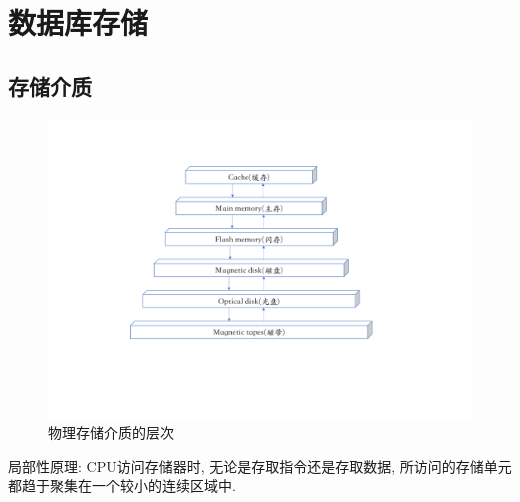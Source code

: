 \chapter{数据库存储}

\section{存储介质}

\begin{figure}[H]
    \centering
    \includegraphics[width=.65\textwidth]{./figure/存储介质层次.pdf}
    \caption{物理存储介质的层次}
\end{figure}

局部性原理: CPU访问存储器时, 无论是存取指令还是存取数据, 所访问的存储单元都趋于聚集在一个较小的连续区域中.

